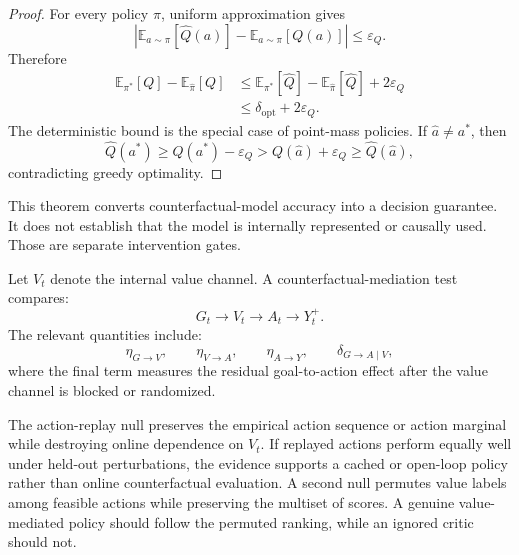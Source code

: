 \begin{proof}
For every policy \(\pi\), uniform approximation gives
\[
\left|
\mathbb E_{a\sim\pi}[\widehat Q(a)]
-
\mathbb E_{a\sim\pi}[Q(a)]
\right|
\leq\varepsilon_Q.
\]
Therefore
\[
\begin{aligned}
\mathbb E_{\pi^*}[Q]
-
\mathbb E_{\widehat\pi}[Q]
&\leq
\mathbb E_{\pi^*}[\widehat Q]
-
\mathbb E_{\widehat\pi}[\widehat Q]
+2\varepsilon_Q\\
&\leq
\delta_{\mathrm{opt}}+2\varepsilon_Q.
\end{aligned}
\]
The deterministic bound is the special case of point-mass policies. If
\(\widehat a\neq a^*\), then
\[
\widehat Q(a^*)
\geq
Q(a^*)-\varepsilon_Q
>
Q(\widehat a)+\varepsilon_Q
\geq
\widehat Q(\widehat a),
\]
contradicting greedy optimality.
\end{proof}

This theorem converts counterfactual-model accuracy into a decision guarantee.
It does not establish that the model is internally represented or causally
used. Those are separate intervention gates.


Let \(V_t\) denote the internal value channel. A counterfactual-mediation test
compares:
\[
G_t
\longrightarrow
V_t
\longrightarrow
A_t
\longrightarrow
Y_t^+.
\]
The relevant quantities include:
\[
\eta_{G\to V},
\qquad
\eta_{V\to A},
\qquad
\eta_{A\to Y},
\qquad
\delta_{G\to A\mid V},
\]
where the final term measures the residual goal-to-action effect after the
value channel is blocked or randomized.

The action-replay null preserves the empirical action sequence or action
marginal while destroying online dependence on \(V_t\). If replayed actions
perform equally well under held-out perturbations, the evidence supports a
cached or open-loop policy rather than online counterfactual evaluation. A
second null permutes value labels among feasible actions while preserving the
multiset of scores. A genuine value-mediated policy should follow the
permuted ranking, while an ignored critic should not.


